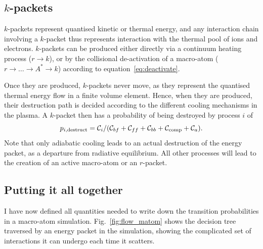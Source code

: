 \noindent

\subsection{$k$-packets}
$k$-packets represent quantised kinetic or thermal energy, and any interaction
chain involving a $k$-packet thus represents interaction with the thermal
pool of ions and electrons. $k$-packets can be produced either directly
via a continuum heating process ($r \rightarrow k$), 
or by the collisional de-activation of a macro-atom 
($r \rightarrow \ldots \rightarrow A^* \rightarrow k$) according to equation~\ref{eq:deactivate}. 

Once they are produced, $k$-packets never move, as they represent the quantised
thermal energy flow in a finite volume element. Hence, when they are produced,
their destruction path is decided according to the different cooling mechanisms
in the plasma. A $k$-packet then has a probability of being destroyed by process $i$ of
\begin{equation}
p_{i,\mathrm{destruct}} = {\cal C}_i / ({\cal C}_{bf} + {\cal C}_{ff} + {\cal C}_{bb} + {\cal C}_{\mathrm{comp}} + {\cal C}_a).
\end{equation}
Note that only adiabatic cooling leads to an actual destruction of the energy packet,
as a departure from radiative equilibrium. All other processes will lead to the 
creation of an active macro-atom or an $r$-packet.



\subsection{Putting it all together}

I have now defined all quantities needed to write down the transition 
probabilities in a macro-atom simulation. Fig.~\ref{fig:flow_matom}
shows the decision tree traversed by an energy packet in the simulation,
showing the complicated set of interactions it can undergo each time it 
scatters.

